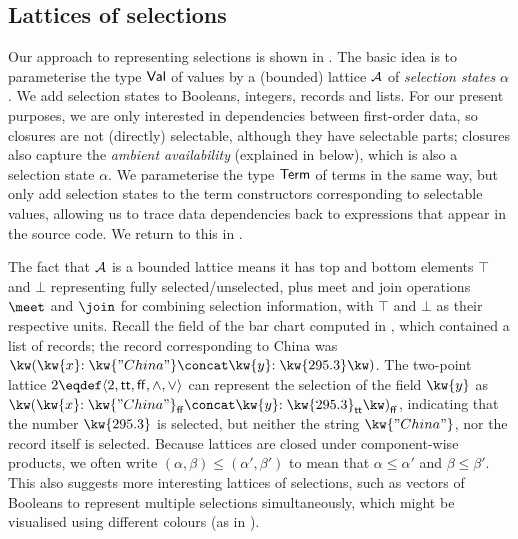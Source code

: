 \subsection{Lattices of selections}
\label{sec:data-dependencies:lattices-of-selections}

Our approach to representing selections is shown in . The basic idea is to parameterise the type $\textup{\textsf{Val}}$ of values by a (bounded) lattice $\mathcal{A}$ of \emph{selection states} $\alpha$. We add selection states to Booleans, integers, records and lists. For our present purposes, we are only interested in dependencies between first-order data, so closures are not (directly) selectable, although they have selectable parts; closures also capture the \emph{ambient availability} (explained in  below), which is also a selection state $\alpha$. We parameterise the type $\textup{\textsf{Term}}$ of terms in the same way, but only add selection states to the term constructors corresponding to selectable values, allowing us to trace data dependencies back to expressions that appear in the source code. We return to this in .



The fact that $\mathcal{A}$ is a bounded lattice means it has top and bottom elements $\top$ and $\bot$ representing fully selected/unselected, plus meet and join operations $\meet$ and $\join$ for combining selection information, with $\top$ and $\bot$ as their respective units. Recall the  field of the bar chart computed in , which contained a list of records; the record corresponding to China was $\exRec{\bind{\kw{x}}{\kw{"China"}} \concat \bind{\kw{y}}{\kw{295.3}}}$.
The two-point lattice $\Bool \eqdef \Lattice{\Bool}{\TT}{\FF}{\wedge}{\vee}$ can represent the selection of the field $\kw{y}$ as $\annRec{\bind{\kw{x}}{\annStr{\kw{"China"}}{\FF}} \concat \bind{\kw{y}}{\annInt{\kw{295.3}}{\TT}}}{\FF}$, indicating that the number $\exInt{\kw{295.3}}$ is selected, but neither the string $\exStr{\kw{"China"}}$, nor the record itself is selected. Because lattices are closed under component-wise products, we often write $(\alpha, \beta) \leq (\alpha', \beta')$ to mean that $\alpha \leq \alpha'$ and $\beta \leq \beta'$. This also suggests more interesting lattices of selections, such as vectors of Booleans to represent multiple selections simultaneously, which might be visualised using different colours (as in ).

